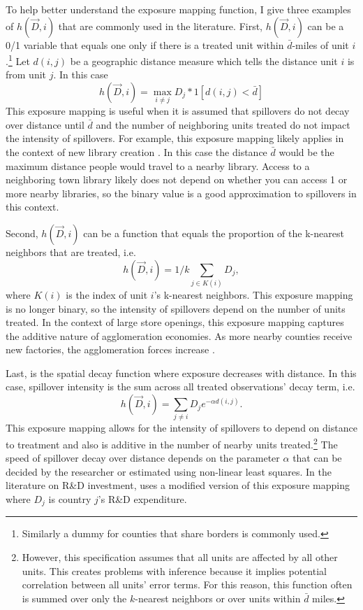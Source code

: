 \documentclass[11pt]{article}
\begin{document}
To help better understand the exposure mapping function, I give three examples of $h(\vec{D}, i)$ that are commonly used in the literature. First, $h(\vec{D}, i)$ can be a 0/1 variable that equals one only if there is a treated unit within $\bar{d}$-miles of unit $i$.\footnote{Similarly a dummy for counties that share borders is commonly used.} Let $d(i,j)$ be a geographic distance measure which tells the distance unit $i$ is from unit $j$.  In this case \[
    h(\vec{D}, i) = \max_{i \neq j} D_j * 1[ d(i,j) < \bar{d} ] 
\] 
This exposure mapping is useful when it is assumed that spillovers do not decay over distance until $\bar{d}$ and the number of neighboring units treated do not impact the intensity of spillovers. For example, this exposure mapping likely applies in the context of new library creation \citep{Berkes_Nencka_2020}. In this case the distance $\bar{d}$ would be the maximum distance people would travel to a nearby library. Access to a neighboring town library likely does not depend on whether you can access 1 or more nearby libraries, so the binary value is a good approximation to spillovers in this context.  

Second, $h(\vec{D}, i)$ can be a function that equals the proportion of the k-nearest neighbors that are treated, i.e. \[
    h(\vec{D}, i) = 1/k \sum_{j \in K(i)} D_j,
\]
where $K(i)$ is the index of unit $i$'s k-nearest neighbors. This exposure mapping is no longer binary, so the intensity of spillovers depend on the number of units treated. In the context of large store openings, this exposure mapping captures the additive nature of agglomeration economies. As more nearby counties receive new factories, the agglomeration forces increase \citep{Basker_2005}.

Last, is the spatial decay function where exposure decreases with distance. In this case, spillover intensity is the sum across all treated observations' decay term, i.e. \[ 
    h(\vec{D}, i) = \sum_{j \neq i} D_j e^{-\alpha d(i,j)}.
\] 
This exposure mapping allows for the intensity of spillovers to depend on distance to treatment and also is additive in the number of nearby units treated.\footnote{However, this specification assumes that all units are affected by all other units. This creates problems with inference because it implies potential correlation between all units' error terms. For this reason, this function often is summed over only the $k$-nearest neighbors or over units within $\bar{d}$ miles.} The speed of spillover decay over distance depends on the parameter $\alpha$ that can be decided by the researcher or estimated using non-linear least squares. In the literature on R\&D investment, \citet{Keller_2002} uses a modified version of this exposure mapping where $D_j$ is country $j$'s R\&D expenditure. 
\end{document}
